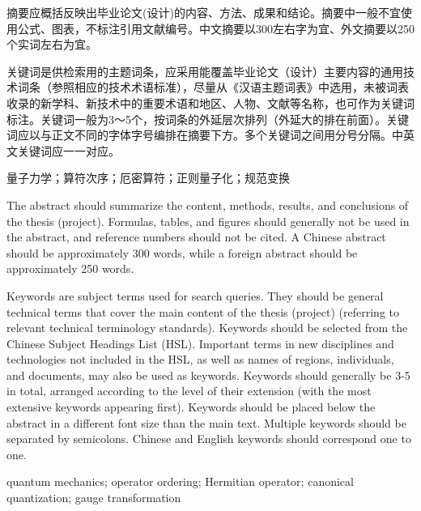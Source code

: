 \begin{abstractCN}
摘要应概括反映出毕业论文(设计)的内容、方法、成果和结论。摘要中一般不宜使用公式、图表，不标注引用文献编号。中文摘要以300左右字为宜、外文摘要以250个实词左右为宜。

关键词是供检索用的主题词条，应采用能覆盖毕业论文（设计）主要内容的通用技术词条（参照相应的技术术语标准），尽量从《汉语主题词表》中选用，未被词表收录的新学科、新技术中的重要术语和地区、人物、文献等名称，也可作为关键词标注。关键词一般为3～5个，按词条的外延层次排列（外延大的排在前面）。关键词应以与正文不同的字体字号编排在摘要下方。多个关键词之间用分号分隔。中英文关键词应一一对应。

    \keywordsCN 量子力学；算符次序；厄密算符；正则量子化；规范变换
\end{abstractCN}

\begin{abstractENG}
The abstract should summarize the content, methods, results, and conclusions of the thesis (project). Formulas, tables, and figures should generally not be used in the abstract, and reference numbers should not be cited. A Chinese abstract should be approximately 300 words, while a foreign abstract should be approximately 250 words.

Keywords are subject terms used for search queries. They should be general technical terms that cover the main content of the thesis (project) (referring to relevant technical terminology standards). Keywords should be selected from the Chinese Subject Headings List (HSL). Important terms in new disciplines and technologies not included in the HSL, as well as names of regions, individuals, and documents, may also be used as keywords. Keywords should generally be 3-5 in total, arranged according to the level of their extension (with the most extensive keywords appearing first). Keywords should be placed below the abstract in a different font size than the main text. Multiple keywords should be separated by semicolons. Chinese and English keywords should correspond one to one.



    \keywordsENG quantum mechanics;  operator ordering;  Hermitian operator;  canonical quantization; gauge transformation
\end{abstractENG}